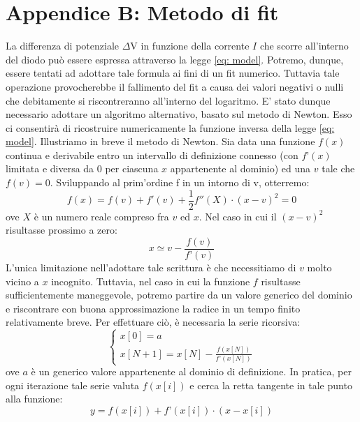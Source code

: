 \documentclass{article}[a4paper, oneside, 11pt]
\begin{document}
\section{Appendice B: Metodo di fit}\label{app: B}
La differenza di potenziale $\Delta$V in funzione della corrente $I$ che scorre 
all’interno del diodo può essere espressa attraverso la legge
\eqref{eq: model}. Potremo, dunque, essere tentati ad adottare tale formula
ai fini di un fit numerico. 
Tuttavia tale operazione provocherebbe il fallimento del fit a causa dei valori 
negativi o nulli che debitamente si riscontreranno all’interno del logaritmo. 
E’ stato dunque necessario adottare un algoritmo alternativo, basato sul 
metodo di Newton\cite{tesi}. Esso ci consentirà di ricostruire numericamente 
la funzione inversa della legge \eqref{eq: model}.
Illustriamo in breve il metodo di Newton. Sia data una funzione $f(x)$ continua e 
derivabile entro un intervallo di definizione connesso (con $f’(x)$ limitata e 
diversa da $0$ per ciascuna $x$ appartenente al dominio) ed una $v$ tale che
$f(v) = 0$. Sviluppando al prim’ordine f in un intorno di v, otterremo:
\begin{equation}
f(x) = f(v) + f{'}(v) + {\frac{1}{2}} {f{''}(X)} \cdot  {( x - v)^2} = 0
\end{equation}
ove $X$ è un numero reale compreso fra $v$ ed $x$. Nel caso in cui il $(x-v)^2 
$risultasse prossimo a zero:
\begin{equation}
x \simeq v   -  {\frac {f(v)}{f’(v)}}
\end{equation}
L’unica limitazione nell’adottare tale scrittura è che necessitiamo di $v$ 
molto vicino a $x$ incognito. Tuttavia, nel caso in cui la funzione $f$ risultasse 
sufficientemente maneggevole, potremo partire da un valore generico del dominio 
e riscontrare con buona approssimazione la radice in un tempo finito 
relativamente breve. Per effettuare ciò, è necessaria la serie ricorsiva:
\begin{equation}
\begin{cases}
x[0] = a \\ x[N+1] = x[N] - \frac {f(x[N])} {f’(x[N])}
\end{cases}
\end{equation}
ove $a$ è un generico valore appartenente al dominio di definizione. In pratica, 
per ogni iterazione tale serie valuta $f(x[i])$ e cerca la retta tangente in tale 
punto alla funzione:
\begin{equation}
y = f(x[i]) + f’(x[i]) \cdot (x-x[i])
\end{equation}
\end{document}
